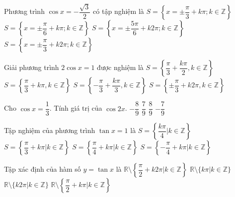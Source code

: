 \begin{ex}
    Phương trình $\cos x = -\dfrac{\sqrt{3}}{2}$ có tập nghiệm là
    \choice
    {$S=\left\{x = \pm \dfrac{\pi}{3} + k\pi; k \in \mathbb{Z}\right\}$}
    {$S=\left\{x = \pm \dfrac{\pi}{6} + k\pi; k \in \mathbb{Z}\right\}$}
    {\True $S=\left\{x = \pm \dfrac{5\pi}{6} + k2\pi; k \in \mathbb{Z}\right\}$}
    {$S=\left\{x = \pm \dfrac{\pi}{3} + k2\pi; k \in \mathbb{Z}\right\}$}
\end{ex}
\begin{ex}
    Giải phương trình $2 \cos x = 1$ được nghiệm là
    \choice
    {$S=\left\{ \dfrac{\pi}{3} + \dfrac{k\pi}{2}, k \in \mathbb{Z} \right\}$}
    {$S=\left\{ \dfrac{\pi}{3} + k\pi, k \in \mathbb{Z} \right\}$}
    {$S=\left\{ -\dfrac{\pi}{3} + \dfrac{k\pi}{3}, k \in \mathbb{Z} \right\}$}
    {\True $S=\left\{ \pm\dfrac{\pi}{3} + k2\pi, k \in \mathbb{Z} \right\}$}
\end{ex}
\begin{ex}
    Cho $\cos x = \dfrac{1}{3}$. Tính giá trị của $\cos 2x$.
    \choice
    {$-\dfrac{8}{9}$}
    {$\dfrac{7}{9}$}
    {$\dfrac{8}{9}$}
    {\True $-\dfrac{7}{9}$}
\end{ex}
\begin{ex}
    Tập nghiệm của phương trình $\tan x = 1$ là
    \choice
    {$S = \left\{\dfrac{k\pi}{4} | k \in \mathbb{Z}\right\}$}
    {$S = \left\{\dfrac{\pi}{3} + k\pi | k \in \mathbb{Z}\right\}$}
    {\True $S = \left\{\dfrac{\pi}{4} + k\pi | k \in \mathbb{Z}\right\}$}
    {$S = \left\{-\dfrac{\pi}{4} + k\pi | k \in \mathbb{Z}\right\}$}
\end{ex}
\begin{ex}
    Tập xác định của hàm số $y = \tan x$ là
    \choice
    {$\mathbb{R} \setminus \left\{\dfrac{\pi}{2} + k2\pi | k \in \mathbb{Z}\right\}$}
    {$\mathbb{R} \setminus \{k\pi | k \in \mathbb{Z}\}$}
    {$\mathbb{R} \setminus \{k2\pi | k \in \mathbb{Z}\}$}
    {\True $\mathbb{R} \setminus \left\{\dfrac{\pi}{2} + k\pi | k \in \mathbb{Z}\right\}$}
\end{ex}
